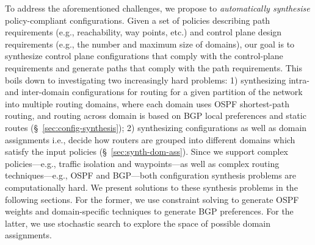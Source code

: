  To address the aforementioned
challenges, we propose to \emph{automatically synthesise}
policy-compliant configurations.  Given a set of policies describing
path requirements (e.g., reachability, way points, etc.)  and control
plane design requirements (e.g., the number and maximum size of
domains), our goal is to synthesize control plane configurations that
comply with the control-plane requirements and generate paths that
comply with the path requirements. This boils down to investigating two increasingly
hard problems: 1) synthesizing intra- and inter-domain configurations
for routing for a given partition of the network into multiple routing
domains, where each domain uses OSPF shortest-path routing, and
routing across domain is based on BGP local preferences and static
routes (\S~\ref{sec:config-synthesis}); 2) synthesizing configurations
as well as domain assignments i.e., decide how routers are grouped
into different domains which satisfy the input policies
(\S~\ref{sec:synth-dom-ass}).  Since we support complex
policies---e.g., traffic isolation and waypoints---as well as complex
routing techniques---e.g., OSPF and BGP---both configuration synthesis
problems are computationally hard.  We present solutions to these
synthesis problems in the following sections. For the former, we use
constraint solving to generate OSPF weights and domain-specific
techniques to generate BGP preferences. For the latter, we use stochastic
search to explore the space of possible domain assignments.